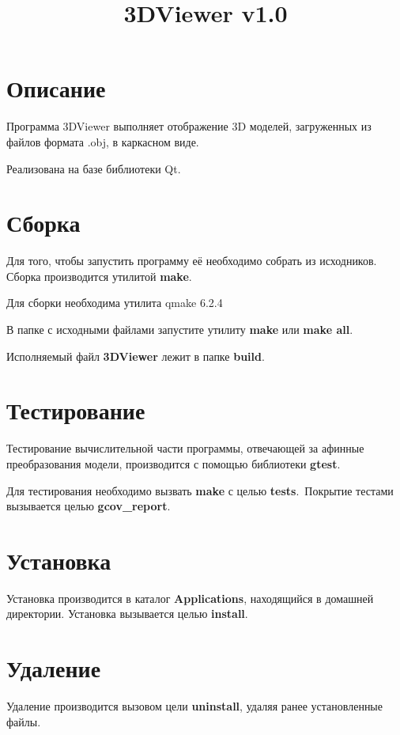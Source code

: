 \documentclass[12pt, a4paper]{article}
\title{3DViewer v1.0}
\date{}
\begin{document}
\maketitle
\tableofcontents

\pagebreak

\section*{Описание}

Программа 3DViewer выполняет отображение 3D моделей, загруженных из файлов формата .obj, в каркасном виде.

Реализована на базе библиотеки Qt.

\section{Сборка}

Для того, чтобы запустить программу её необходимо собрать из исходников.
Сборка производится утилитой \textbf{make}.

Для сборки необходима утилита qmake 6.2.4

В папке с исходными файлами запустите утилиту \textbf{make} или \textbf{make all}.

Исполняемый файл \textbf{3DViewer} лежит в папке \textbf{build}.

\section{Тестирование}
Тестирование вычислительной части программы, отвечающей за афинные
преобразования модели, производится с помощью библиотеки \textbf{gtest}.

Для тестирования необходимо вызвать \textbf{make} с целью \textbf{tests}.\
Покрытие тестами вызывается целью \textbf{gcov\_report}.

\section{Установка}
Установка производится в каталог \textbf{Applications}, находящийся в домашней
директории.
Установка вызывается целью \textbf{install}.

\section{Удаление}
Удаление производится вызовом цели \textbf{uninstall}, удаляя ранее
установленные файлы.
\vfill
\end{document}
